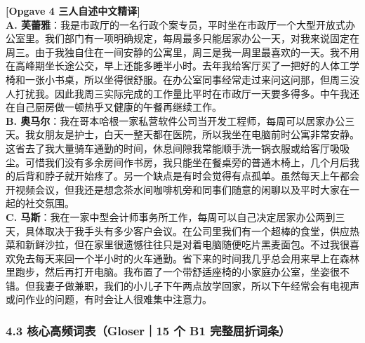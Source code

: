 \begin{answerbox}
\vspace{0.3em}
\textbf{\color{NCDTeal}[Opgave 4 三人自述中文精译]}\\
\textbf{A. 芙蕾雅}：我是市政厅的一名行政个案专员，平时坐在市政厅一个大型开放式办公室里。我们部门有一项明确规定，每周最多只能居家办公一天，对我来说固定在周三。由于我独自住在一间安静的公寓里，周三是我一周里最喜欢的一天。我不用在高峰期坐长途公交，早上还能多睡半小时。去年我给客厅买了一把好的人体工学椅和一张小书桌，所以坐得很舒服。在办公室同事经常走过来问这问那，但周三没人打扰我。因此我周三实际完成的工作量比平时在市政厅一天要多得多。中午我还在自己厨房做一顿热乎又健康的午餐再继续工作。\\
\textbf{B. 奥马尔}：我在哥本哈根一家私营软件公司当开发工程师，每周可以居家办公三天。我女朋友是护士，白天一整天都在医院，所以我坐在电脑前时公寓非常安静。这省去了我大量骑车通勤的时间，休息间隙我常能顺手洗一锅衣服或给客厅吸吸尘。可惜我们没有多余房间作书房，我只能坐在餐桌旁的普通木椅上，几个月后我的后背和脖子就开始疼了。另一个缺点是有时会觉得有点孤单。虽然每天上午都会开视频会议，但我还是想念茶水间咖啡机旁和同事们随意的闲聊以及平时大家在一起的社交氛围。\\
\textbf{C. 马斯}：我在一家中型会计师事务所工作，每周可以自己决定居家办公两到三天，具体取决于我手头有多少客户会议。在公司里我们有一个超棒的食堂，供应热菜和新鲜沙拉，但在家里很遗憾往往只是对着电脑随便吃片黑麦面包。不过我很喜欢免去每天来回一个半小时的火车通勤。省下来的时间我几乎总会用来早上在森林里跑步，然后再打开电脑。我布置了一个带舒适座椅的小家庭办公室，坐姿很不错。但我妻子做兼职，我们的小儿子下午两点放学回家，所以下午经常会有电视声或问作业的问题，有时会让人很难集中注意力。
\end{answerbox}

\subsubsection*{4.3 核心高频词表（Gloser｜15 个 B1 完整屈折词条）}

